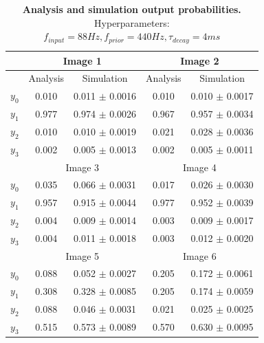 \begin{table}[]
\centering
\label{tab:1D_88_440_4}
\small
\tabcolsep=0.11cm
\begin{tabular}{|c|cc|cc|}
\hline
                       & \multicolumn{2}{c|}{Image 1}                       & \multicolumn{2}{c|}{Image 2}                       \\ \hline
                       & \multicolumn{1}{c|}{Analysis} & Simulation         & \multicolumn{1}{c|}{Analysis} & Simulation         \\ \hline
$y_0$                  & \multicolumn{1}{c|}{0.010}    & 0.011 $\pm$ 0.0016 & \multicolumn{1}{c|}{0.010}    & 0.010 $\pm$ 0.0017 \\ \hline
$y_1$                  & \multicolumn{1}{c|}{0.977}    & 0.974 $\pm$ 0.0026 & \multicolumn{1}{c|}{0.967}    & 0.957 $\pm$ 0.0034 \\ \hline
$y_2$                  & \multicolumn{1}{c|}{0.010}    & 0.010 $\pm$ 0.0019 & \multicolumn{1}{c|}{0.021}    & 0.028 $\pm$ 0.0036 \\ \hline
$y_3$                  & \multicolumn{1}{c|}{0.002}    & 0.005 $\pm$ 0.0013 & \multicolumn{1}{c|}{0.002}    & 0.005 $\pm$ 0.0011 \\ \hline
                       & \multicolumn{2}{c|}{Image 3}                       & \multicolumn{2}{c|}{Image 4}                       \\ \hline
$y_0$                  & \multicolumn{1}{c|}{0.035}    & 0.066 $\pm$ 0.0031 & \multicolumn{1}{c|}{0.017}    & 0.026 $\pm$ 0.0030 \\ \hline
$y_1$                  & \multicolumn{1}{c|}{0.957}    & 0.915 $\pm$ 0.0044 & \multicolumn{1}{c|}{0.977}    & 0.952 $\pm$ 0.0039 \\ \hline
$y_2$                  & \multicolumn{1}{c|}{0.004}    & 0.009 $\pm$ 0.0014 & \multicolumn{1}{c|}{0.003}    & 0.009 $\pm$ 0.0017 \\ \hline
$y_3$                  & \multicolumn{1}{c|}{0.004}    & 0.011 $\pm$ 0.0018 & \multicolumn{1}{c|}{0.003}    & 0.012 $\pm$ 0.0020 \\ \hline
						& \multicolumn{2}{c|}{Image 5}                       & \multicolumn{2}{c|}{Image 6}                       \\ \hline
$y_0$                  & \multicolumn{1}{c|}{0.088}    & 0.052 $\pm$ 0.0027 & \multicolumn{1}{c|}{0.205}    & 0.172 $\pm$ 0.0061 \\ \hline
$y_1$                  & \multicolumn{1}{c|}{0.308}    & 0.328 $\pm$ 0.0085 & \multicolumn{1}{c|}{0.205}    & 0.174 $\pm$ 0.0059 \\ \hline
$y_2$                  & \multicolumn{1}{c|}{0.088}    & 0.046 $\pm$ 0.0031 & \multicolumn{1}{c|}{0.021}    & 0.025 $\pm$ 0.0025 \\ \hline
$y_3$                  & \multicolumn{1}{c|}{0.515}    & 0.573 $\pm$ 0.0089 & \multicolumn{1}{c|}{0.570}    & 0.630 $\pm$ 0.0095 \\ \hline
\end{tabular}
\caption{\textbf{Analysis and simulation output probabilities. } Hyperparameters: $f_{input} = 88 Hz, f_{prior} = 440 Hz, \tau_{decay} = 4 ms$}
\end{table}


